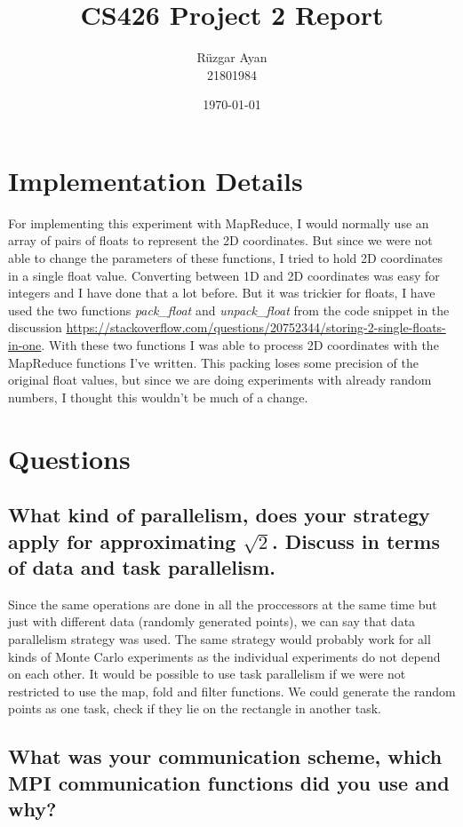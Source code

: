 \documentclass{article}
\title{CS426 Project 2 Report}
\author{Rüzgar Ayan \\ 21801984}
\date{\today}
\begin{document}
\maketitle

\section{Implementation Details}
For implementing this experiment with MapReduce, I would normally use an array of pairs of floats to represent the 2D coordinates. But since we were not able to change the parameters of these functions, I tried to hold 2D coordinates in a single float value. Converting between 1D and 2D coordinates was easy for integers and I have done that a lot before. But it was trickier for floats, I have used the two functions \emph{pack\_float} and \emph{unpack\_float} from the code snippet in the discussion \href{https://stackoverflow.com/questions/20752344/storing-2-single-floats-in-one}{https://stackoverflow.com/questions/20752344/storing-2-single-floats-in-one}. With these two functions I was able to process 2D coordinates with the MapReduce functions I've written. This packing loses some precision of the original float values, but since we are doing experiments with already random numbers, I thought this wouldn't be much of a change. 

\section{Questions}
\subsection{What kind of parallelism, does your strategy apply for approximating $\sqrt{2}$. Discuss in terms of data and task parallelism.}
Since the same operations are done in all the proccessors at the same time but just with different data (randomly generated points), we can say that data parallelism strategy was used. The same strategy would probably work for all kinds of Monte Carlo experiments as the individual experiments do not depend on each other. It would be possible to use task parallelism if we were not restricted to use the map, fold and filter functions. We could  generate the random points as one task, check if they lie on the rectangle in another task. 

\subsection{What was your communication scheme, which MPI communication functions did you use and why?}
\end{document}
